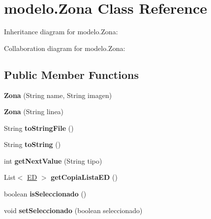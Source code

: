 \hypertarget{classmodelo_1_1_zona}{}\section{modelo.\+Zona Class Reference}
\label{classmodelo_1_1_zona}


Inheritance diagram for modelo.\+Zona\+:


Collaboration diagram for modelo.\+Zona\+:
\subsection*{Public Member Functions}
\begin{DoxyCompactItemize}
\item 
\mbox{\label{classmodelo_1_1_zona_a1be4bcab3ca76125a2ab065bb4d79114}} 
{\bfseries Zona} (String name, String imagen)
\item 
\mbox{\label{classmodelo_1_1_zona_a0866956d21be4423b0a4b6292b349f6e}} 
{\bfseries Zona} (String linea)
\item 
\mbox{\label{classmodelo_1_1_zona_a1697e1ce1aaa4574a30e6519546bf214}} 
String {\bfseries to\+String\+File} ()
\item 
\mbox{\label{classmodelo_1_1_zona_a5e285ed339ef7daee4021c7cab1bcac4}} 
String {\bfseries to\+String} ()
\item 
\mbox{\label{classmodelo_1_1_zona_aa7241417dbf1153844826e19e9be1112}} 
int {\bfseries get\+Next\+Value} (String tipo)
\item 
\mbox{\label{classmodelo_1_1_zona_ab133c3ea1a52d41ab1cd9aa2401f68f6}} 
List$<$ \mbox{\hyperlink{classmodelo_1_1_e_d}{ED}} $>$ {\bfseries get\+Copia\+Lista\+ED} ()
\item 
\mbox{\label{classmodelo_1_1_zona_a6a050ef3f3fe96afa0c56f1e20a4ef94}} 
boolean {\bfseries is\+Seleccionado} ()
\item 
\mbox{\label{classmodelo_1_1_zona_a5dfc8daf37a79588971bee64ceef3ca4}} 
void {\bfseries set\+Seleccionado} (boolean seleccionado)

\end{DoxyCompactItemize}
